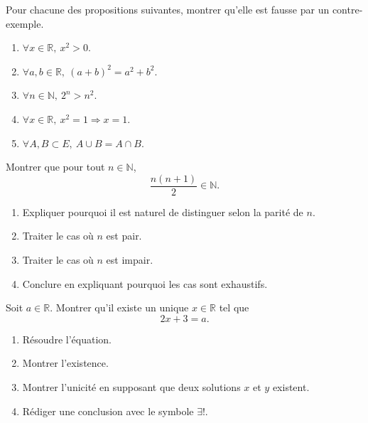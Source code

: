 \documentclass[11pt,a4paper]{article}
\newcommand{\N}{\mathbb{N}}
\newcommand{\R}{\mathbb{R}}
\newcommand{\imp}{\Rightarrow}
\begin{document}
\begin{exercicebox}
Pour chacune des propositions suivantes, montrer qu'elle est fausse par un contre-exemple.

\begin{enumerate}[label=\alph*)]
    \item \(\forall x\in\R,\ x^2>0\).
    \item \(\forall a,b\in\R,\ (a+b)^2=a^2+b^2\).
    \item \(\forall n\in\N,\ 2^n>n^2\).
    \item \(\forall x\in\R,\ x^2=1\imp x=1\).
    \item \(\forall A,B\subset E,\ A\cup B=A\cap B\).
\end{enumerate}
\end{exercicebox}

\begin{exercicebox}
Montrer que pour tout \(n\in\N\),
\[
\frac{n(n+1)}{2}\in\N.
\]

\begin{enumerate}[label=\alph*)]
    \item Expliquer pourquoi il est naturel de distinguer selon la parité de \(n\).
    \item Traiter le cas où \(n\) est pair.
    \item Traiter le cas où \(n\) est impair.
    \item Conclure en expliquant pourquoi les cas sont exhaustifs.
\end{enumerate}
\end{exercicebox}

\begin{exercicebox}
Soit \(a\in\R\). Montrer qu'il existe un unique \(x\in\R\) tel que
\[
2x+3=a.
\]

\begin{enumerate}[label=\alph*)]
    \item Résoudre l'équation.
    \item Montrer l'existence.
    \item Montrer l'unicité en supposant que deux solutions \(x\) et \(y\) existent.
    \item Rédiger une conclusion avec le symbole \(\exists!\).
\end{enumerate}
\end{exercicebox}
\end{document}
